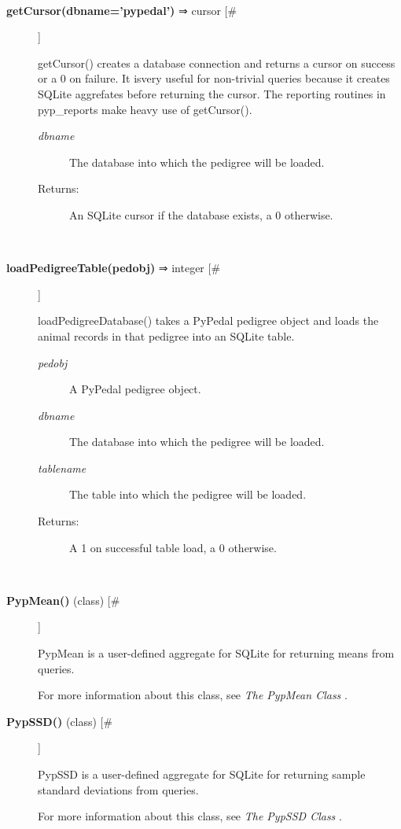 \documentclass[10pt]{article}
\begin{document}
\begin{description}
\begin{description}
\end{description}
\\ 

\item[\textbf{getCursor(dbname='pypedal')}
 ⇒ cursor [\#]]

 getCursor() creates a database connection and returns a cursor on success or a 0 on failure. It isvery useful for non-trivial queries because it creates SQLite aggrefates before returning the cursor. The reporting routines in pyp\_reports make heavy use of getCursor().
\begin{description}
\item[\emph{dbname}
] The database into which the pedigree will be loaded.
\item[Returns:] An SQLite cursor if the database exists, a 0 otherwise.

\end{description}
\\ 

\item[\textbf{loadPedigreeTable(pedobj)}
 ⇒ integer [\#]]

 loadPedigreeDatabase() takes a PyPedal pedigree object and loads the animal records in that pedigree into an SQLite table.
\begin{description}
\item[\emph{pedobj}
] A PyPedal pedigree object.
\item[\emph{dbname}
] The database into which the pedigree will be loaded.
\item[\emph{tablename}
] The table into which the pedigree will be loaded.
\item[Returns:] A 1 on successful table load, a 0 otherwise.

\end{description}
\\ 

\item[\textbf{PypMean()}
 (class) [\#]]

 PypMean is a user-defined aggregate for SQLite for returning means from queries.


 For more information about this class, see \emph{The PypMean Class}
.

\item[\textbf{PypSSD()}
 (class) [\#]]

 PypSSD is a user-defined aggregate for SQLite for returning sample standard deviations from queries.


 For more information about this class, see \emph{The PypSSD Class}
.


\end{description}
\end{document}
